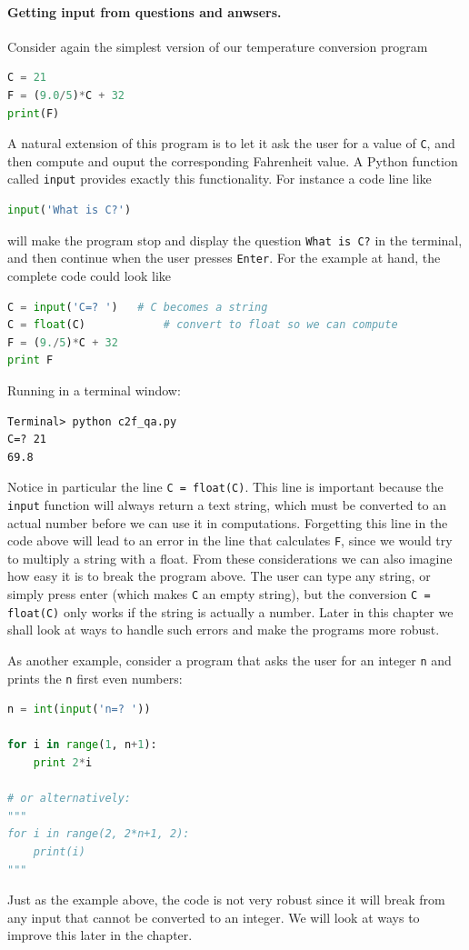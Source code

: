 \documentclass[graybox,envcountchap,sectrefs,final]{svmonodo}
\begin{document}
\paragraph{Getting input from questions and anwsers.}
Consider again the simplest version of our temperature conversion program
\begin{lstlisting}[language=Python,style=blue1]
C = 21
F = (9.0/5)*C + 32
print(F)
\end{lstlisting}
A natural extension of this program is to let it ask the user for a value of \texttt{C}, and then compute and ouput the corresponding
Fahrenheit value. A Python function called \texttt{input} provides exactly this functionality. For instance a code line like
\begin{lstlisting}[language=Python,style=blue1]
input('What is C?')
\end{lstlisting}
will make the program stop and display the question \texttt{What is C?} in the terminal, and then continue when the user presses \texttt{Enter}.
For the example at hand, the complete code could look like
\begin{lstlisting}[language=Python,style=blue1]
C = input('C=? ')   # C becomes a string
C = float(C)            # convert to float so we can compute
F = (9./5)*C + 32
print F
\end{lstlisting}
Running in a terminal window:
\begin{Verbatim}[frame=lines,label=\fbox{{\tiny Terminal}},framesep=2.5mm,framerule=0.7pt]
Terminal> python c2f_qa.py
C=? 21
69.8
\end{Verbatim}
Notice in particular the line \texttt{C = float(C)}. This line is important because the \texttt{input} function will always return a text string, which
must be converted to an actual number before we can use it in computations. Forgetting this line in the code above will lead to an error
in the line that calculates \texttt{F}, since we would try to multiply a string with a float. From these considerations we can also imagine
how easy it is to break the program above. The user can type any string, or simply press enter (which makes \texttt{C} an empty string), but the
conversion \texttt{C = float(C)} only works if the string is actually a number. Later in this chapter we shall look at ways to handle such errors
and make the programs more robust.

As another example, consider a program that asks the user for an integer \texttt{n} and prints the \texttt{n} first even numbers:
\begin{lstlisting}[language=Python,style=blue1]
n = int(input('n=? '))

for i in range(1, n+1):
    print 2*i

# or alternatively:
"""
for i in range(2, 2*n+1, 2):
    print(i)
"""
\end{lstlisting}
Just as the example above, the code is not very robust since it will break from any input that cannot be converted to an integer.
We will look at ways to improve this later in the chapter.
\end{document}
